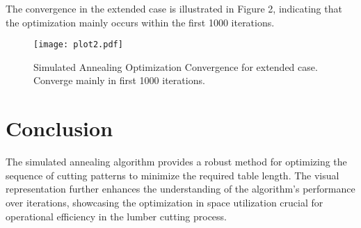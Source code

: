 \documentclass{article}
\begin{document}
The convergence in the extended case is illustrated in Figure 2, indicating that the optimization mainly occurs within the first 1000 iterations.

\begin{figure}[h]
    \centering
    \texttt{[image: plot2.pdf]}
    \caption{Simulated Annealing Optimization Convergence for extended case. Converge mainly in first 1000 iterations.}
\end{figure}

\section{Conclusion}
The simulated annealing algorithm provides a robust method for optimizing the sequence of cutting patterns to minimize the required table length. The visual representation further enhances the understanding of the algorithm's performance over iterations, showcasing the optimization in space utilization crucial for operational efficiency in the lumber cutting process.
\end{document}
